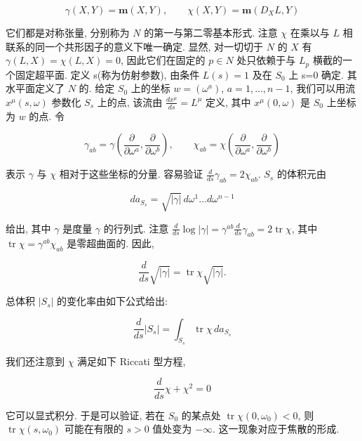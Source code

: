 \begin{equation}
\gamma(X, Y) = \mathbf{m}(X, Y), \qquad \chi(X, Y) = \mathbf{m}(D_{X}L, Y)\label{eq:cA-438}
\end{equation}

它们都是对称张量, 分别称为 $N$ 的第一与第二零基本形式. 注意 $\chi$ 在乘以与 $L$ 相联系的同一个共形因子的意义下唯一确定. 显然, 对一切切于 $N$ 的 $X$ 有 $\gamma(L, X) = \chi(L, X) = 0$, 因此它们在固定的 $p\in N$ 处只依赖于与 $L_{p}$ 横截的一个固定超平面. 定义 s(称为仿射参数), 由条件 $L(s)=1$ 及在 $S_{0}$ 上 s=0 确定. 其水平面定义了 $N$ 的. 给定 $S_{0}$ 上的坐标 $w=(\omega^{a})$, $a=1, \ldots, n-1$, 我们可以用流 $x^{\mu}(s, \omega)$ 参数化 $S_{s}$ 上的点, 该流由 $\frac{dx^{\mu}}{ds}=L^{\mu}$ 定义, 其中 $x^{\mu}(0, \omega)$ 是 $S_{0}$ 上坐标为 $w$ 的点. 令

\[
\gamma_{ab} = \gamma\left(\frac{\partial}{\partial\omega^{a}}, \frac{\partial}{\partial\omega^{b}}\right), \qquad \chi_{ab} = \chi\left(\frac{\partial}{\partial\omega^{a}}, \frac{\partial}{\partial\omega^{b}}\right)
\]

表示 $\gamma$ 与 $\chi$ 相对于这些坐标的分量. 容易验证 $\frac{d}{ds}\gamma_{ab} = 2\chi_{ab}$. $S_{s}$ 的体积元由

\[
da_{S_{s}} = \sqrt{|\gamma|}\, d\omega^{1}\dots d\omega^{n-1}
\]

给出, 其中 $\gamma$ 是度量 $\gamma$ 的行列式. 注意 $\frac{d}{ds}\log|\gamma| = \gamma^{ab}\frac{d}{ds}\gamma_{ab} = 2\operatorname{tr}\chi$, 其中 $\operatorname{tr}\chi = \gamma^{ab}\chi_{ab}$ 是零超曲面的. 因此,

\[
\frac{d}{ds}\sqrt{|\gamma|} = \operatorname{tr}\chi\sqrt{|\gamma|}.
\]

总体积 $|S_{s}|$ 的变化率由如下公式给出:

\begin{equation}
\frac{d}{ds}|S_{s}| = \int_{S_{s}}\operatorname{tr}\chi\, da_{S_{s}}\label{eq:cA-439}
\end{equation}

我们还注意到 $\chi$ 满足如下 Riccati 型方程,

\begin{equation}
\frac{d}{ds}\chi + \chi^{2} = 0\label{eq:cA-440}
\end{equation}

它可以显式积分. 于是可以验证, 若在 $S_{0}$ 的某点处 $\operatorname{tr}\chi(0, \omega_{0}) < 0$, 则 $\operatorname{tr}\chi(s, \omega_{0})$ 可能在有限的 $s>0$ 值处变为 $-\infty$. 这一现象对应于焦散的形成.

